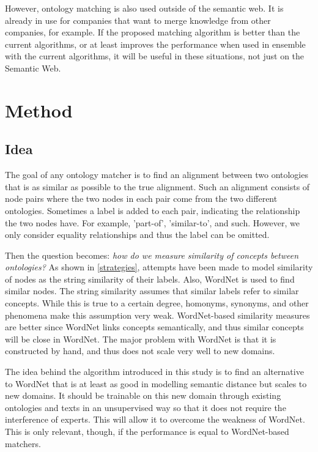 \documentclass{article}
\begin{document}
 However, ontology matching is also used outside of the semantic web. It is already in use for companies that want to merge knowledge from other companies, for example. If the proposed matching algorithm is better than the current algorithms, or at least improves the performance when used in ensemble with the current algorithms, it will be useful in these situations, not just on the Semantic Web.

 \newpage
 \section{Method}

 
 \subsection{Idea}
The goal of any ontology matcher is to find an alignment between two ontologies that is as similar as possible to the true alignment. Such an alignment consists of node pairs where the two nodes in each pair come from the two different ontologies. Sometimes a label is added to each pair, indicating the relationship the two nodes have. For example, 'part-of', 'similar-to', and such. However, we only consider equality relationships and thus the label can be omitted.
 
 Then the question becomes: \textit{how do we measure similarity of concepts between ontologies?} As shown in \ref{strategies}, attempts have been made to model similarity of nodes as the string similarity of their labels. Also, WordNet is used to find similar nodes. The string similarity assumes that similar labels refer to similar concepts. While this is true to a certain degree, homonyms, synonyms, and other phenomena make this assumption very weak. WordNet-based similarity measures are better since WordNet links concepts semantically, and thus similar concepts will be close in WordNet. The major problem with WordNet is that it is constructed by hand, and thus does not scale very well to new domains.
 
 The idea behind the algorithm introduced in this study is to find an alternative to WordNet that is at least as good in modelling semantic distance but scales to new domains. It should be trainable on this new domain through existing ontologies and texts in an unsupervised way so that it does not require the interference of experts. This will allow it to overcome the weakness of WordNet. This is only relevant, though, if the performance is equal to WordNet-based matchers.
 
\end{document}
